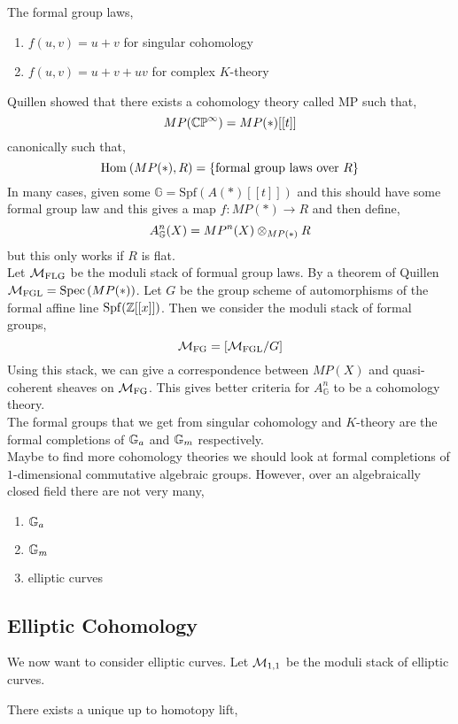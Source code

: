 \documentclass[12pt]{article}
\begin{document}
\begin{example}
The formal group laws,
\begin{enumerate}
\item $f(u,v) = u + v$ for singular cohomology
\item $f(u,v ) = u + v + u v$ for complex $K$-theory
\end{enumerate}
\end{example}

Quillen showed that there exists a cohomology theory called MP such that,
\[ MP(\mathbb{CP}^\infty) = MP(*)[[t]] \]
canonically such that,
\[ \mathrm{Hom}_{} \left( MP(*), R \right) = \{ \text{formal group laws over } R \} \]
In many cases, given some $\mathbb{G} = \mathrm{Spf}(A(*)[[t]])$ and this should have some formal group law and this gives a map $f : MP(*) \to R$ and then define,
\[ A_{\mathbb{G}}^n(X) = MP^n(X) \otimes_{MP(*)} R \]
but this only works if $R$ is flat. 
\bigskip\\
Let $\mathcal{M}_{\text{FLG}}$ be the moduli stack of formual group laws. By a theorem of Quillen $\mathcal{M}_{\text{FGL}} = \mathrm{Spec}\left( MP(*) \right)$. Let $G$ be the group scheme of automorphisms of the formal affine line $\mathrm{Spf}(\mathbb{Z}[[x]])$. Then we consider the moduli stack of formal groups,
\[ \mathcal{M}_{\text{FG}} = [\mathcal{M}_{\text{FGL}} / G ] \]
Using this stack, we can give a correspondence between $MP(X)$ and quasi-coherent sheaves on $\mathcal{M}_{\text{FG}}$. This gives better criteria for $A_{\mathbb{G}}^n$ to be a cohomology theory.
\bigskip\\
The formal groups that we get from singular cohomology and $K$-theory are the formal completions of $\mathbb{G}_a$ and $\mathbb{G}_m$ respectively. 
\bigskip\\
Maybe to find more cohomology theories we should look at formal completions of $1$-dimensional commutative algebraic groups. However, over an algebraically closed field there are not very many,
\begin{enumerate}
\item $\mathbb{G}_a$
\item $\mathbb{G}_m$
\item elliptic curves
\end{enumerate} 

\subsection{Elliptic Cohomology}

We now want to consider elliptic curves. Let $\mathcal{M}_{1,1}$ be the moduli stack of elliptic curves. 

\begin{thm}
There exists a unique up to homotopy lift,
\begin{center}
\end{center}
\end{thm}
\end{document}
